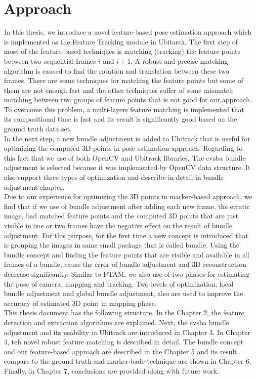 \section {Approach}
In this thesis, we introduce a novel feature-based pose estimation approach which is implemented as the Feature Tracking module in Ubitarck. The first step of most of the feature-based techniques is matching (tracking) the feature points between two sequential frames $i$ and $i+1$. A robust and precise matching algorithm is caused to find the rotation and translation between these two frames. There are some techniques for matching the feature points but some of them are not enough fast and the other techniques suffer of some mismatch matching between two groups of feature points that is not good for our approach. To overcome this problem, a multi-layers feature matching is implemented that its compositional time is fast and its result is significantly good based on the ground truth data set.\\
In the next step, a new bundle adjustment is added to Ubitrack that is useful for optimizing the computed 3D points in pose estimation approach. Regarding to this fact that we use of both OpenCV and Ubitrack libraries, The cvsba bundle adjustment is selected because it was implemented by OpenCV data structure. It also support three types of optimization and describe in detail in bundle adjustment chapter.\\
Due to our experience for optimizing the 3D points in marker-based approach, we find that if we use of bundle adjustment after adding each new frame, the erratic image, bad matched feature points and the computed 3D points that are just visible in one or two frames have the negative effect on the result of bundle adjustment. For this purpose, for the first time a new concept is introduced that is grouping the images in same small package that is called bundle. Using the bundle concept and finding the feature points that are visible and available in all frames of a bundle, cause the error of bundle adjustment and 3D reconstruction decrease significantly. Similar to PTAM, we also use of two phases for estimating the pose of camera, mapping and tracking. Two levels of optimization, local bundle adjustment and global bundle adjustment, also are used to improve the accuracy of estimated 3D point in mapping phase.\\

This thesis document has the following structure. In the Chapter 2, the feature detection and extraction algorithms are explained. Next, the cvsba bundle adjustment and its usability in Ubitrack are introduced in Chapter 3. In Chapter 4, teh novel robust feature matching is described in detail. The bundle concept and our feature-based approach are described in the Chapter 5 and its result compare to the ground truth and marker-bade technique are shown in Chapter 6. Finally, in Chapter 7, conclusions are provided along with future work.


